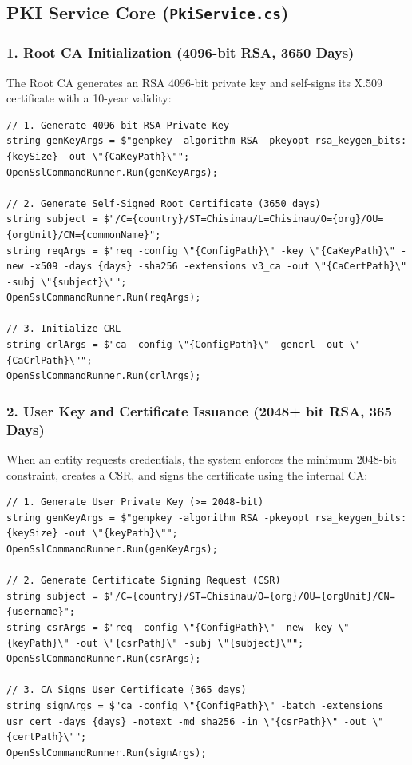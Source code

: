 \documentclass[12pt,a4paper]{article}
\begin{document}
\subsection{PKI Service Core (\texttt{PkiService.cs})}

\subsubsection{1. Root CA Initialization (4096-bit RSA, 3650 Days)}
The Root CA generates an RSA 4096-bit private key and self-signs its X.509 certificate with a 10-year validity:
\begin{lstlisting}
// 1. Generate 4096-bit RSA Private Key
string genKeyArgs = $"genpkey -algorithm RSA -pkeyopt rsa_keygen_bits:{keySize} -out \"{CaKeyPath}\"";
OpenSslCommandRunner.Run(genKeyArgs);

// 2. Generate Self-Signed Root Certificate (3650 days)
string subject = $"/C={country}/ST=Chisinau/L=Chisinau/O={org}/OU={orgUnit}/CN={commonName}";
string reqArgs = $"req -config \"{ConfigPath}\" -key \"{CaKeyPath}\" -new -x509 -days {days} -sha256 -extensions v3_ca -out \"{CaCertPath}\" -subj \"{subject}\"";
OpenSslCommandRunner.Run(reqArgs);

// 3. Initialize CRL
string crlArgs = $"ca -config \"{ConfigPath}\" -gencrl -out \"{CaCrlPath}\"";
OpenSslCommandRunner.Run(crlArgs);
\end{lstlisting}

\subsubsection{2. User Key and Certificate Issuance (2048+ bit RSA, 365 Days)}
When an entity requests credentials, the system enforces the minimum 2048-bit constraint, creates a CSR, and signs the certificate using the internal CA:
\begin{lstlisting}
// 1. Generate User Private Key (>= 2048-bit)
string genKeyArgs = $"genpkey -algorithm RSA -pkeyopt rsa_keygen_bits:{keySize} -out \"{keyPath}\"";
OpenSslCommandRunner.Run(genKeyArgs);

// 2. Generate Certificate Signing Request (CSR)
string subject = $"/C={country}/ST=Chisinau/O={org}/OU={orgUnit}/CN={username}";
string csrArgs = $"req -config \"{ConfigPath}\" -new -key \"{keyPath}\" -out \"{csrPath}\" -subj \"{subject}\"";
OpenSslCommandRunner.Run(csrArgs);

// 3. CA Signs User Certificate (365 days)
string signArgs = $"ca -config \"{ConfigPath}\" -batch -extensions usr_cert -days {days} -notext -md sha256 -in \"{csrPath}\" -out \"{certPath}\"";
OpenSslCommandRunner.Run(signArgs);
\end{lstlisting}
\end{document}
